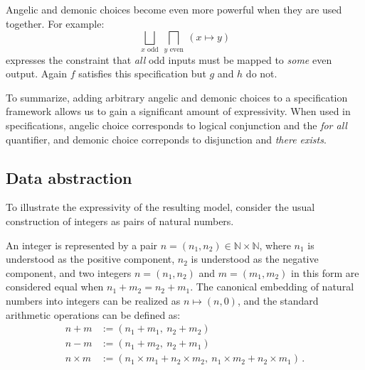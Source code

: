 \documentclass[draft,11pt]{report}
\theoremstyle{definition}
\begin{document}
Angelic and demonic choices become even more powerful
when they are used together.
For example:
\[
  \bigsqcup_{x \text{ odd}} \:
  \bigsqcap_{y \text{ even}} \:
  (x \mapsto y)
\]
expresses the constraint that \emph{all} odd inputs 
must be mapped to \emph{some} even output.
Again $f$ satisfies this specification but $g$ and $h$ do not.

To summarize,
adding arbitrary angelic and demonic choices
to a specification framework
allows us to gain a significant amount of expressivity.
When used in specifications,
angelic choice corresponds to
logical conjunction and the \emph{for all} quantifier,
and demonic choice correponds to
disjunction and \emph{there exists}.


\subsection{Data abstraction} \label{sec:fspec-ab} %

To illustrate the expressivity of the resulting model,
consider the usual construction of integers
as pairs of natural numbers.

An integer is represented by a pair
$n = (n_1, n_2) \in \mathbb{N} \times \mathbb{N}$,
where
$n_1$ is understood as the positive component,
$n_2$ is understood as the negative component,
and two integers $n = (n_1, n_2)$ and $m = (m_1, m_2)$
in this form
are considered equal when
$n_1 + m_2 = n_2 + m_1$.
The canonical embedding of natural numbers into integers
can be realized as $n \mapsto (n, 0)$, and
the standard arithmetic operations can be defined as:
\begin{align*}
  n + m &:= (n_1 + m_1, \: n_2 + m_2) \\
  n - m &:= (n_1 + m_2, \: n_2 + m_1) \\
  n \times m &:= (n_1 \times m_1 + n_2 \times m_2, \:
    n_1 \times m_2 + n_2 \times m_1)
  \,.
\end{align*}
\end{document}
